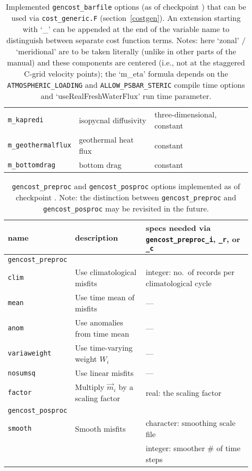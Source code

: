 \begin{table}[!ht]
\begin{tabular}{lll}
\texttt{m\_kapredi}			&	isopycnal diffusivity			& three-dimensional, constant \\ 
\texttt{m\_geothermalflux}		&	geothermal heat flux			& constant \\ 
\texttt{m\_bottomdrag}		&	bottom drag				& constant \\
\end{tabular}
\caption{Implemented \texttt{gencost\_barfile} options (as of checkpoint \mitgcmCheckpointVersion) that can be used via \texttt{cost\_generic.F} (section~\ref{costgen}). An extension starting with `\_' can be appended at the end of the variable name to distinguish between separate cost function terms. Notes: here `zonal' / `meridional' are to be taken literally (unlike in other parts of the manual) and these components are centered (i.e., not at the staggered C-grid velocity points); the `m\_eta' formula depends on the \texttt{ATMOSPHERIC\_LOADING} and \texttt{ALLOW\_PSBAR\_STERIC} compile time options and `useRealFreshWaterFlux' run time parameter.}
\label{tbl:gencost_ecco_barfile}
\end{table}

\begin{table}[!ht]
\centering
\begin{tabular}{lll}
name					&	description					&	specs needed via \texttt{gencost\_preproc\_i}, \texttt{\_r}, or \texttt{\_c} \\ \hline\hline
\texttt{gencost\_preproc} \\ \hline
\texttt{clim} 				&	Use climatological misfits	&	integer: no.\ of records per climatological cycle \\
\texttt{mean} 				&	Use time mean of misfits 	&	--- \\
\texttt{anom} 				&	Use anomalies from time mean &	--- \\
\texttt{variaweight}		&	Use time-varying weight $W_i$&	--- \\
\texttt{nosumsq} 			&	Use linear misfits 			&	--- \\
\texttt{factor} 			&	Multiply $\vec{m}_i$ by a scaling factor	&	real: the scaling factor \\ \hline \hline
\texttt{gencost\_posproc} \\ \hline
\texttt{smooth} 			&	Smooth misfits				&	character: smoothing scale file\\ 
						&								&	integer: smoother \# of time steps \\
\end{tabular} 
\caption{\texttt{gencost\_preproc} and \texttt{gencost\_posproc} options implemented as of checkpoint \mitgcmCheckpointVersion. Note: the distinction between \texttt{gencost\_preproc} and \texttt{gencost\_posproc} may be revisited in the future.}
\label{tbl:gencost_ecco_preproc}
\end{table}

